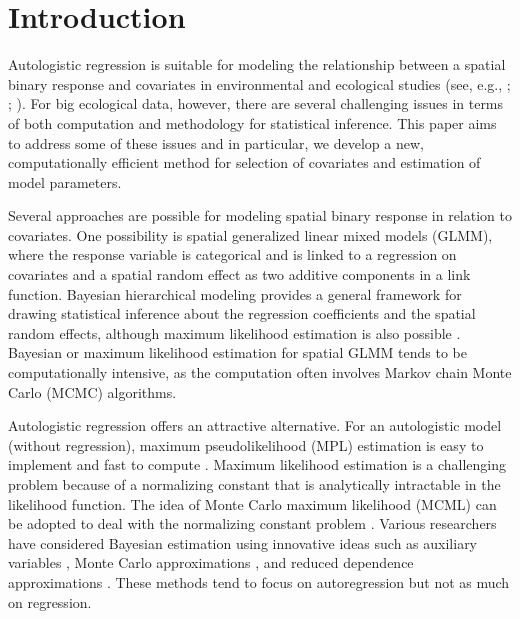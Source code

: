 \documentclass[authoryear,review, 12pt]{elsarticle}
\begin{document}
%
%
\section{Introduction}
\label{sec:intro}
 
Autologistic regression is suitable for modeling the relationship between a spatial binary response and covariates in environmental and ecological studies (see, e.g., \cite{gumpertzg97}; \cite{hufferw98}; \cite{hez03}).  For big ecological data, however, there are several challenging issues in terms of both computation and methodology for statistical inference. This paper aims to address some of these issues and in particular, we develop a new, computationally efficient method for selection of covariates and estimation of model parameters.

Several approaches are possible for modeling spatial binary response in relation to covariates.  One possibility is spatial generalized linear mixed models (GLMM), where the response variable is categorical and is linked to a regression on covariates and a spatial random effect as two additive components in a link function.  Bayesian hierarchical modeling provides a general framework for drawing statistical inference about the regression coefficients and the spatial random effects, although maximum likelihood estimation is also possible \citep{diggler07, banerjeec03}.  Bayesian or maximum likelihood estimation for spatial GLMM tends to be computationally intensive, as the computation often involves Markov chain Monte Carlo (MCMC) algorithms.  

Autologistic regression offers an attractive alternative. For an autologistic model (without regression), maximum pseudolikelihood (MPL) estimation is easy to implement  and fast to compute \citep{besag72, besag74}.  Maximum likelihood estimation is a challenging problem because of a normalizing constant that is analytically intractable in the likelihood function.  The idea of Monte Carlo maximum likelihood (MCML) can be adopted to deal with the normalizing constant problem \citep{geyer94}.  Various researchers have considered Bayesian estimation using innovative ideas such as auxiliary variables \citep{mollerp06}, Monte Carlo approximations \citep{sunc08}, and reduced dependence approximations \citep{frielp09}.  These methods tend to focus on autoregression but not as much on regression.  
\end{document}
